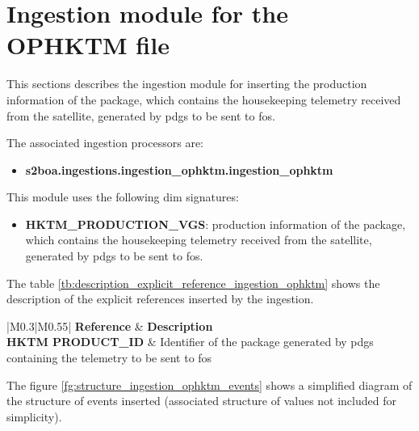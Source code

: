 \section{Ingestion module for the OPHKTM file}

This sections describes the ingestion module for inserting the production information of the package, which contains the housekeeping telemetry received from the satellite, generated by \acrshort{pdgs} to be sent to \acrshort{fos}.

The associated ingestion processors are:

\begin{itemize} 

\item \textbf{s2boa.ingestions.ingestion\_ophktm.ingestion\_ophktm}
  
\end{itemize}

This module uses the following \acrshort{dim} signatures:

\begin{itemize} 

\item \textbf{HKTM\_PRODUCTION\_VGS}: production information of the package, which contains the housekeeping telemetry received from the satellite, generated by \acrshort{pdgs} to be sent to \acrshort{fos}.
  
\end{itemize}

The table \ref{tb:description_explicit_reference_ingestion_ophktm} shows the description of the explicit references inserted by the ingestion.

\begin{longtable}{|M{0.3\linewidth}|M{0.55\linewidth}|}
\hline \textbf{Reference} & \textbf{Description} \\ \hline
\textbf{HKTM PRODUCT\_ID} & Identifier of the package generated by \acrshort{pdgs} containing the telemetry to be sent to \acrshort{fos} \\ \hline
\caption{Table describing the explicit reference associated to the ingestion}
\label{tb:description_explicit_reference_ingestion_ophktm}
\end{longtable}

The figure \ref{fg:structure_ingestion_ophktm_events} shows a simplified diagram of the structure of events inserted (associated structure of values not included for simplicity).

